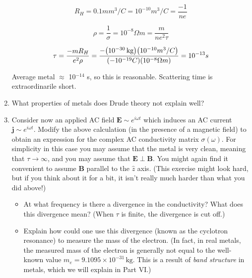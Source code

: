 \begin{enumerate}[label=(\alph*)]
    \[ R_H = 0.1 mm^3/C = 10^{-10} m^3/C = \frac{-1}{n e} \]

    \[ \rho = \frac{1}{\sigma} = 10^{-8} \Omega m = \frac{m}{n e^2 \tau} \]

    \[ \tau = \frac{-m R_H}{e^2 \rho} = \frac{-\paren*{10^{-30}\, \text{kg}} \paren*{10^{-10} m^{3}/C}}{\paren*{-10^{-19} C} \paren*{10^{-8} \Omega m}} = 10^{-13} s \]

Average metal $\approx$ 10$^{-14}$ s, so this is reasonable. Scattering time is extraordinarile short. 


\item What properties of metals does Drude theory not explain well?

\item Consider now an applied AC field $\mathbf{E} \sim e^{i \omega t}$ which induces an AC current $\mathbf{j} \sim e^{i \omega t}$. Modify the above calculation (in the presence of a magnetic field) to obtain an expression for the complex AC conductivity matrix $\sigma(\omega)$. For simplicity in this case you may assume that the metal is very clean, meaning that $\tau \to \infty$, and you may assume that $\mathbf{E} \perp \mathbf{B}$. You might again find it convenient to assume $\mathbf{B}$ parallel to the $\hat{z}$ axis. (This exercise might look hard, but if you think about it for a bit, it isn’t really much harder than what you did above!)

\begin{itemize}
    \item At what frequency is there a divergence in the conductivity? What does this divergence mean? (When $\tau$ is finite, the divergence is cut off.)
    \item Explain how could one use this divergence (known as the cyclotron resonance) to measure the mass of the electron. (In fact, in real metals, the measured mass of the electron is generally not equal to the well-known value $m_e = 9.1095 \times 10^{-31}\,\mathrm{kg}$. This is a result of \textit{band structure} in metals, which we will explain in Part VI.)
\end{itemize}

\end{enumerate}
